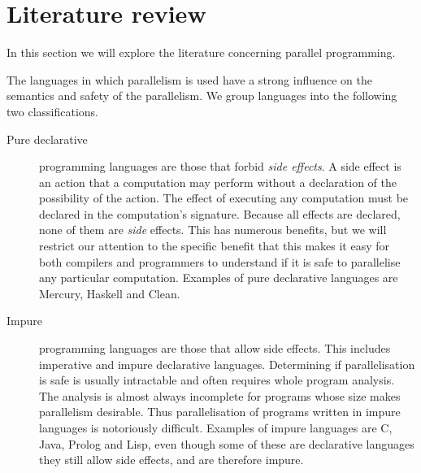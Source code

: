 
%

\section{Literature review}
\label{sec:literature_review}

In this section we will explore the literature concerning parallel
programming.

The languages in which parallelism is used have a strong influence on the
semantics and safety of the parallelism.
We group languages into the following two classifications.

\begin{description}

    \item[Pure declarative] programming languages are those that forbid
    \emph{side effects}.
    A side effect is an action that a computation may perform
    without a declaration of the possibility of the action.
    The effect of executing any computation must be declared in the
    computation's signature.
    Because all effects are declared, none of them are \emph{side} effects.
    This has numerous benefits,
    but we will restrict our attention to the specific benefit
    that this makes it easy for both compilers and programmers to understand
    if it is safe to parallelise any particular computation.
    Examples of pure declarative languages are Mercury, Haskell and
    Clean.

    \item[Impure] programming languages are those that allow side effects.
    This includes imperative and impure declarative languages.
    Determining if parallelisation is safe is usually intractable and often
    requires whole program analysis.
    The analysis is almost always incomplete for programs whose size makes
    parallelism desirable.
    Thus parallelisation of programs written in impure languages is notoriously
    difficult.
    Examples of impure languages are C, Java, Prolog and Lisp,
    even though some of these are declarative languages they still allow
    side effects, and are therefore impure.

\end{description}

